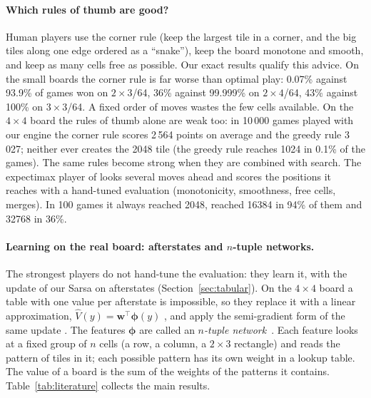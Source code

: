 \documentclass[11pt,a4paper]{article}
\theoremstyle{remark}
\begin{document}
\paragraph{Which rules of thumb are good?} Human players use the corner rule (keep the largest tile in a corner, and the big tiles along one edge ordered as a ``snake''), keep the board monotone and smooth, and keep as many cells free as possible. Our exact results qualify this advice. On the small boards the corner rule is far worse than optimal play: 0.07\% against 93.9\% of games won on $2\times3$/64, 36\% against 99.999\% on $2\times4$/64, 43\% against 100\% on $3\times3$/64. A fixed order of moves wastes the few cells available. On the $4\times4$ board the rules of thumb alone are weak too: in 10\,000 games played with our engine the corner rule scores 2\,564 points on average and the greedy rule 3\,027; neither ever creates the 2048 tile (the greedy rule reaches 1024 in 0.1\% of the games). The same rules become strong when they are combined with search. The expectimax player of \cite{nneonneo2014} looks several moves ahead and scores the positions it reaches with a hand-tuned evaluation (monotonicity, smoothness, free cells, merges). In 100 games it always reached 2048, reached 16384 in 94\% of them and 32768 in 36\%.

\paragraph{Learning on the real board: afterstates and $n$-tuple networks.}
\label{sec:ntuple}
The strongest players do not hand-tune the evaluation: they learn it, with the update of our Sarsa on afterstates (Section~\ref{sec:tabular}). On the $4\times4$ board a table with one value per afterstate is impossible, so they replace it with a linear approximation, $\hat V(y)=\mathbf w^\top\boldsymbol\phi(y)$ \cite[\S9.4]{sutton2018}, and apply the semi-gradient form of the same update \cite[\S10.1]{sutton2018}. The features $\boldsymbol\phi$ are called an \emph{$n$-tuple network}~\cite{szubert2014}. Each feature looks at a fixed group of $n$ cells (a row, a column, a $2\times3$ rectangle) and reads the pattern of tiles in it; each possible pattern has its own weight in a lookup table. The value of a board is the sum of the weights of the patterns it contains. Table~\ref{tab:literature} collects the main results.
\end{document}
